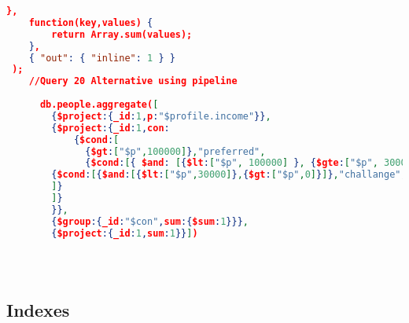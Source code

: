 \begin{enumerate}[label=Q\arabic*]
\begin{lstlisting}[language=JSON,   basicstyle=\scriptsize]
    },
    function(key,values) {
        return Array.sum(values);
    },
    { "out": { "inline": 1 } }
 );
 	//Query 20 Alternative using pipeline
	
	  db.people.aggregate([
		{$project:{_id:1,p:"$profile.income"}},
		{$project:{_id:1,con:
			{$cond:[
			  {$gt:["$p",100000]},"preferred",
			  {$cond:[{ $and: [{$lt:["$p", 100000] }, {$gte:["$p", 30000] }] },"standard",
		{$cond:[{$and:[{$lt:["$p",30000]},{$gt:["$p",0]}]},"challange","na"]}
		]}
		]}
		}},
		{$group:{_id:"$con",sum:{$sum:1}}},
		{$project:{_id:1,sum:1}}])
		

    
	\end{lstlisting}
\end{enumerate}
\subsection{Indexes}
